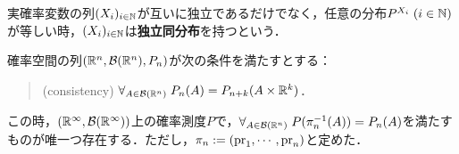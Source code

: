 \documentclass[uplatex,dvipdfmx]{jsreport}
\begin{document}
\begin{definition}
    実確率変数の列$(X_i)_{i\in\mathbb{N}}$が互いに独立であるだけでなく，任意の分布$P^{X_i}\;(i\in\mathbb{N})$が等しい時，$(X_i)_{i\in\mathbb{N}}$は\textbf{独立同分布}を持つという．
\end{definition}

\begin{theorem}\label{thm-Kolmogorov-extension-theorem}
    確率空間の列$(\mathbb{R}^n,\mathcal{B}(\mathbb{R}^n),P_n)$が次の条件を満たすとする：
    \begin{quote}
        (consistency) $\forall_{A\in\mathcal{B}(\mathbb{R}^n)}\;P_n(A)=P_{n+k}(A\times\mathbb{R}^k)$．
    \end{quote}
    この時，$(\mathbb{R}^\infty,\mathcal{B}(\mathbb{R}^\infty))$上の確率測度$P$で，$\forall_{A\in\mathcal{B}(\mathbb{R}^n)}\;P(\pi_n^{-1}(A))=P_n(A)$を満たすものが唯一つ存在する．ただし，$\pi_n:=(\mathrm{pr}_1,\cdots,\mathrm{pr}_n)$と定めた．
\end{theorem}
\end{document}
